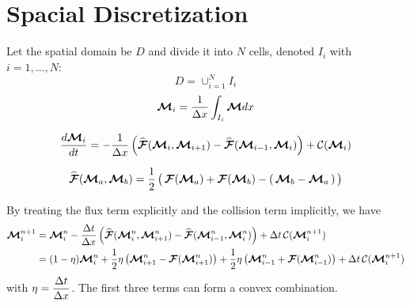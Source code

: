 \section{Spacial Discretization}
Let the spatial domain be $D$ and divide it into $N$ cells, denoted $I_{i}$ with $i = 1,\ldots,N$:
\begin{equation*}
D = \cup_{i = 1}^{N} I_{i}
\end{equation*}
\begin{equation}
\bcM_{i} = \dfrac{1}{\dx} \int_{I_i}\bcM dx
\end{equation}

\begin{equation}
\dfrac{d \bcM_{i}}{d t} = - \dfrac{1}{\dx} \left( \widehat{\bcF}(\bcM_{i},\bcM_{i+1}) -  \widehat{\bcF}(\bcM_{i-1},\bcM_{i})\right) +  \cC(\bcM_{i})
\end{equation}

\begin{equation}
  \widehat{\bcF}(\vect{\cM}_{a},\vect{\cM}_{b})
  =\f{1}{2}\,\big(\,\bcF(\vect{\cM}_{a})+\bcF(\vect{\cM}_{b})-(\,\vect{\cM}_{b}-\vect{\cM}_{a}\,)\,\big)
\end{equation}

By treating the flux term explicitly and the collision term implicitly, we have
\begin{align}
\bcM_{i}^{n+1} 
& = \bcM_{i}^{n} - \dfrac{\dt}{\dx} \left( \widehat{\bcF}(\bcM^{n}_{i},\bcM^{n}_{i+1}) -  \widehat{\bcF}(\bcM^{n}_{i-1},\bcM^{n}_{i})\right) + \dt\,\cC(\bcM^{n+1}_{i}) \nonumber \\
& = (1-\eta)\bcM_{i}^{n} + \f{1}{2}\eta\left( \bcM^{n}_{i+1}-\bcF(\bcM^{n}_{i+1})\right)  + \f{1}{2}\eta\left( \bcM^{n}_{i-1}+\bcF(\bcM^{n}_{i-1})\right) + \dt\,\cC(\bcM^{n+1}_{i})
\end{align}
with $\eta = \dfrac{\dt}{\dx}$. The first three terms can form a convex combination.
